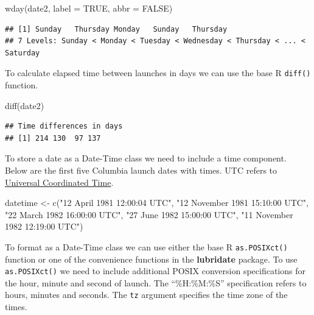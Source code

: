 \documentclass[
]{book}
\newenvironment{Shaded}{\begin{snugshade}}{\end{snugshade}}
\newcommand{\AttributeTok}[1]{\textcolor[rgb]{0.77,0.63,0.00}{#1}}
\newcommand{\ConstantTok}[1]{\textcolor[rgb]{0.00,0.00,0.00}{#1}}
\newcommand{\FunctionTok}[1]{\textcolor[rgb]{0.00,0.00,0.00}{#1}}
\newcommand{\NormalTok}[1]{#1}
\newcommand{\OtherTok}[1]{\textcolor[rgb]{0.56,0.35,0.01}{#1}}
\newcommand{\StringTok}[1]{\textcolor[rgb]{0.31,0.60,0.02}{#1}}
\begin{document}
\begin{Shaded}
\begin{Highlighting}[]
\FunctionTok{wday}\NormalTok{(date2, }\AttributeTok{label =} \ConstantTok{TRUE}\NormalTok{, }\AttributeTok{abbr =} \ConstantTok{FALSE}\NormalTok{)}
\end{Highlighting}
\end{Shaded}

\begin{verbatim}
## [1] Sunday   Thursday Monday   Sunday   Thursday
## 7 Levels: Sunday < Monday < Tuesday < Wednesday < Thursday < ... < Saturday
\end{verbatim}

To calculate elapsed time between launches in days we can use the base R \texttt{diff()} function.

\begin{Shaded}
\begin{Highlighting}[]
\FunctionTok{diff}\NormalTok{(date2)}
\end{Highlighting}
\end{Shaded}

\begin{verbatim}
## Time differences in days
## [1] 214 130  97 137
\end{verbatim}

To store a date as a Date-Time class we need to include a time component. Below are the first five Columbia launch dates with times. UTC refers to \href{https://en.wikipedia.org/wiki/Coordinated_Universal_Time}{Universal Coordinated Time}.

\begin{Shaded}
\begin{Highlighting}[]
\NormalTok{datetime }\OtherTok{\textless{}{-}} \FunctionTok{c}\NormalTok{(}\StringTok{"12 April 1981 12:00:04 UTC"}\NormalTok{,}
              \StringTok{"12 November 1981 15:10:00 UTC"}\NormalTok{,}
              \StringTok{"22 March 1982 16:00:00 UTC"}\NormalTok{,}
              \StringTok{"27 June 1982 15:00:00 UTC"}\NormalTok{,}
              \StringTok{"11 November 1982 12:19:00 UTC"}\NormalTok{)}
\end{Highlighting}
\end{Shaded}

To format as a Date-Time class we can use either the base R \texttt{as.POSIXct()} function or one of the convenience functions in the \textbf{lubridate} package. To use \texttt{as.POSIXct()} we need to include additional POSIX conversion specifications for the hour, minute and second of launch. The ``\%H:\%M:\%S'' specification refers to hours, minutes and seconds. The \texttt{tz} argument specifies the time zone of the times.
\end{document}
